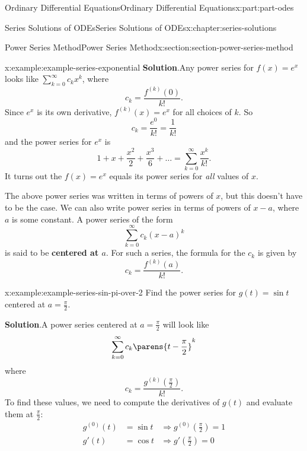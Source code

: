 \documentclass[twoside,10pt,]{book}
\newcommand{\blocktitlefont}{\relax}
\newcommand{\terminology}[1]{\textbf{#1}}
\numberwithin{equation}{part}
\newcommand{\amp}{&}
\begin{document}
\begin{partptx}{Ordinary Differential Equations}{}{Ordinary Differential Equations}{}{}{x:part:part-odes}
\begin{chapterptx}{Series Solutions of ODEs}{}{Series Solutions of ODEs}{}{}{x:chapter:series-solutions}
\begin{sectionptx}{Power Series Method}{}{Power Series Method}{}{}{x:section:section-power-series-method}
\begin{example}{}{x:example:example-series-exponential}
\noindent\textbf{\blocktitlefont Solution}.\hypertarget{g:solution:idp105548817381408}{}\quad{}Any power series for \(f(x) = e^{x}\) looks like \(\sum_{k=0}^{\infty}c_{k}x^{k}\), where%
\begin{equation*}
c_{k} = \frac{f^{(k)}(0)}{k!}.
\end{equation*}
Since \(e^{x}\) is its own derivative, \(f^{(k)}(x) = e^{x}\) for all choices of \(k\). So%
\begin{equation*}
c_{k} = \frac{e^{0}}{k!} = \frac{1}{k!}
\end{equation*}
and the power series for \(e^{x}\) is%
\begin{equation*}
1+x+\frac{x^{2}}{2}+\frac{x^{3}}{6} + \dots = \sum_{k=0}^{\infty}\frac{x^{k}}{k!}.
\end{equation*}
It turns out the \(f(x) = e^{x}\) equals its power series for \emph{all} values of \(x\).%
\end{example}
The above power series was written in terms of powers of \(x\), but this doesn't have to be the case. We can also write power series in terms of powers of \(x-a\), where \(a\) is some constant. A power series of the form%
\begin{equation*}
\sum_{k=0}^{\infty}c_{k}(x-a)^{k}
\end{equation*}
is said to be \terminology{centered at \(a\)}. For such a series, the formula for the \(c_{k}\) is given by%
\begin{equation*}
c_{k} = \frac{f^{(k)}(a)}{k!}.
\end{equation*}
%
\begin{example}{}{x:example:example-series-sin-pi-over-2}%
Find the power series for \(g(t) = \sin t\) centered at \(a = \frac{\pi}{2}\).%
\par\smallskip%
\noindent\textbf{\blocktitlefont Solution}.\hypertarget{g:solution:idp105548817358240}{}\quad{}A power series centered at \(a = \frac{\pi}{2}\) will look like%
\begin{equation*}
\sum_{k=0}^{\infty}c_{k}\parens{t-\frac{\pi}{2}}^{k}
\end{equation*}
where%
\begin{equation*}
c_{k} = \frac{g^{(k)}(\frac{\pi}{2})}{k!}.
\end{equation*}
To find these values, we need to compute the derivatives of \(g(t)\) and evaluate them at \(\frac{\pi}{2}\):%
\begin{align*}
g^{(0)}(t) \amp= \sin t \amp\Rightarrow g^{(0)}(\frac{\pi}{2}) = 1\\
g'(t) \amp= \cos t \amp\Rightarrow g'(\frac{\pi}{2}) = 0\\

\end{align*}
\end{example}
\end{sectionptx}
\end{chapterptx}
\end{partptx}
\end{document}
